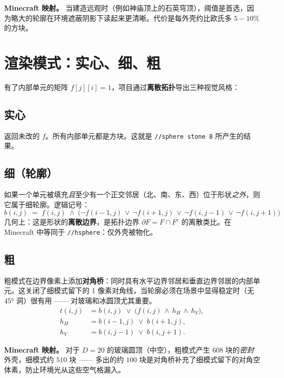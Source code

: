 \documentclass[12pt,a4paper]{scrartcl}
\newcommand{\acc}[1]{\textcolor{accent}{\textbf{#1}}}
\newcommand{\cmd}[1]{\textcolor{earth}{\texttt{\small #1}}}
\begin{document}
\begin{minec}
\textbf{Minecraft 映射。} 当建造远观时（例如神庙顶上的石英穹顶），阈值是首选，因为略大的轮廓在环境遮蔽阴影下读起来更清晰。代价是每外壳约比欧氏多 $5{-}10\%$ 的方块。
\end{minec}

\section{渲染模式：实心、细、粗}

有了内部单元的矩阵 $f[j][i] = 1$，项目通过\acc{离散拓扑}导出三种视觉风格：

\subsection{实心}
返回未改的 $f$。所有内部单元都是方块。这就是 \cmd{//sphere stone 8} 所产生的结果。

\subsection{细（轮廓）}
如果一个单元被填充\emph{且}至少有一个正交邻居（北、南、东、西）位于形状\emph{之外}，则它属于细轮廓。逻辑记号：
\[
b(i,j) \;=\; f(i,j) \;\wedge\;
\bigl(\neg f(i{-}1,j)\,\vee\,\neg f(i{+}1,j)\,\vee\,\neg f(i,j{-}1)\,\vee\,\neg f(i,j{+}1)\bigr)
\]
几何上：这是形状的\acc{离散边界}，是拓扑边界 $\partial F = F \cap \overline{F^{\mathrm{c}}}$ 的离散类比。在 Minecraft 中等同于 \cmd{//hsphere}：仅外壳被物化。

\subsection{粗}
粗模式在边界像素上添加\acc{对角桥}：同时具有水平边界邻居和垂直边界邻居的内部单元。这关闭了细模式留下的 1 像素对角线，当轮廓必须在场景中显得稳定时（无 $45°$ 洞）很有用 —— 对玻璃和冰圆顶尤其重要。
\begin{align*}
t(i,j) &= b(i,j) \;\vee\; \bigl(f(i,j) \,\wedge\, h_H \,\wedge\, h_V\bigr), \\
h_H &= b(i{-}1,j) \;\vee\; b(i{+}1,j), \\
h_V &= b(i,j{-}1) \;\vee\; b(i,j{+}1).
\end{align*}

\begin{minec}
\textbf{Minecraft 映射。} 对于 $D=20$ 的玻璃圆顶（中空），粗模式产生 $608$ 块的\emph{密封}外壳，细模式约 $510$ 块 —— 多出的约 $100$ 块是对角桥补充了细模式留下的对角空体素，防止环境光从这些空气格漏入。
\end{minec}
\end{document}
